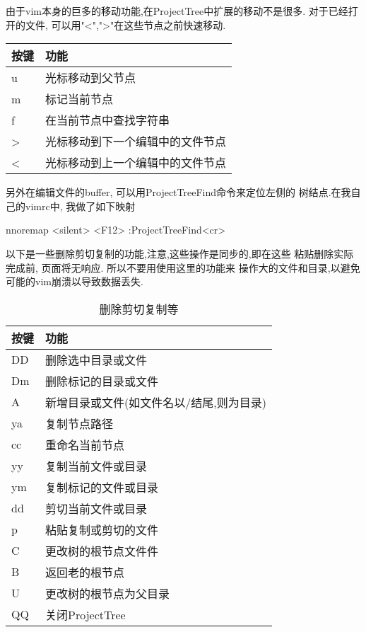 \documentclass[oneside,openany]{book}
\begin{document}
  由于vim本身的巨多的移动功能,在ProjectTree中扩展的移动不是很多. 对于已经打开的文件,
可以用"<",">"在这些节点之前快速移动.
  \begin{table}[H]
  \centering
      \begin{tabular}{p{40pt}p{220pt}}
        \toprule
        按键& 功能\\
        \midrule
          u     &光标移动到父节点\\
          m     &标记当前节点\\
          f     &在当前节点中查找字符串\\
          >     &光标移动到下一个编辑中的文件节点\\
          <     &光标移动到上一个编辑中的文件节点\\
      \bottomrule
      \end{tabular}
  \end{table}
  另外在编辑文件的buffer, 可以用ProjectTreeFind命令来定位左侧的
树结点.\newline 在我自己的vimrc中, 我做了如下映射
  \begin{mdframed}[style=SmallFrame]
    \begin{flushleft}
      nnoremap <silent> <F12> :ProjectTreeFind<cr>
    \end{flushleft}
  \end{mdframed}

  以下是一些删除剪切复制的功能,注意,这些操作是同步的,即在这些
粘贴删除实际完成前, 页面将无响应. 所以不要用使用这里的功能来
操作大的文件和目录,以避免可能的vim崩溃以导致数据丢失.
  \begin{table}[H]
  \caption{删除剪切复制等}
  \centering
      \begin{tabular}{p{40pt}p{220pt}}
        \toprule
        按键& 功能\\
        \midrule
          DD    &删除选中目录或文件\\
          Dm    &删除标记的目录或文件\\
          A     &新增目录或文件(如文件名以/结尾,则为目录)\\
          ya    &复制节点路径\\
          cc    &重命名当前节点\\
          yy    &复制当前文件或目录\\
          ym    &复制标记的文件或目录\\
          dd    &剪切当前文件或目录\\
          p     &粘贴复制或剪切的文件\\
          C     &更改树的根节点文件件\\
          B     &返回老的根节点\\
          U     &更改树的根节点为父目录\\
          QQ    &关闭ProjectTree\\
        \bottomrule
      \end{tabular}
  \end{table}
\end{document}
